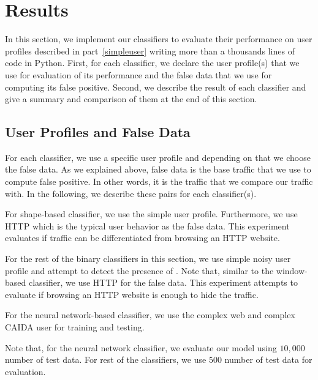 \vspace{-0.2mm}
\section{Results}\label{sec:exp}
In this section, we implement our classifiers to evaluate their performance on user profiles described in part~\ref{simpleuser} writing more than a thousands lines of code in Python. First, for each classifier, we declare the user profile(s) that we use for evaluation of its performance and the false data that we use for computing its false positive. Second, we describe the result of each classifier and give a summary and comparison of them at the end of this section.

\subsection{User Profiles and False Data}

For each classifier, we use a specific user profile and depending on that we choose the false data. As we explained above,  false data is the base traffic that we use to compute false positive. In other words, it is the traffic that we compare our \bc traffic with. In the following, we describe these pairs for each classifier(s). 
\begin{compactitem}

\item For shape-based classifier, we use the simple user profile. Furthermore, we use HTTP which is the typical user behavior as the false data. This experiment evaluates if \bc traffic can be differentiated from browsing an HTTP website. 
\item  For the rest of the binary classifiers in this section, we use simple noisy user profile and attempt to detect the presence of \bc. Note that, similar to the window-based classifier, we use HTTP for the false data. This experiment attempts to evaluate if browsing an HTTP website is enough to hide the \bc traffic. 
\item For the neural network-based classifier, we use the complex web and complex CAIDA user for training and testing.
\end{compactitem}
Note that, for the neural network classifier, we evaluate our model using $10,000$ number of test data. For rest of the classifiers, we use $500$ number of test data for evaluation.


